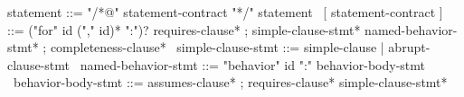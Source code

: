 \begin{syntax}
  statement ::= "/*@" statement-contract "*/" statement
  \
  [ statement-contract ] ::= {("for" id ("," id)* ":")?} requires-clause* ;
    simple-clause-stmt* named-behavior-stmt* ;
    completeness-clause*
  \
  simple-clause-stmt ::= simple-clause | { abrupt-clause-stmt }
  \
  named-behavior-stmt ::= "behavior" id ":" behavior-body-stmt
  \
  behavior-body-stmt ::= assumes-clause* ;
       requires-clause* simple-clause-stmt*
\end{syntax}

